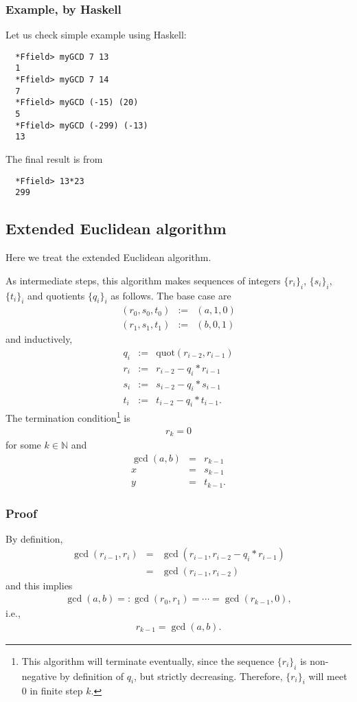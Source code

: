 \documentclass[11pt]{book}
\begin{document}
\subsubsection{Example, by Haskell}
Let us check simple example using Haskell:
\begin{verbatim}
  *Ffield> myGCD 7 13
  1
  *Ffield> myGCD 7 14
  7
  *Ffield> myGCD (-15) (20)
  5
  *Ffield> myGCD (-299) (-13)
  13
\end{verbatim}
The final result is from
\begin{verbatim}
  *Ffield> 13*23
  299
\end{verbatim}

\subsection{Extended Euclidean algorithm}
\label{exGCD}
Here we treat the extended Euclidean algorithm.

As intermediate steps, this algorithm makes sequences of integers $\{r_i\}_i$, $\{s_i\}_i$, $\{t_i\}_i$ and quotients $\{q_i\}_i$ as follows.
The base case are
\begin{eqnarray}
\left(r_0, s_0, t_0 \right) &:=& (a,1,0) \\
\left(r_1, s_1, t_1 \right) &:=& (b,0,1) 
\end{eqnarray}
and inductively,
\begin{eqnarray}
q_i &:=& \text{quot}(r_{i-2}, r_{i-1}) \\
r_i &:=& r_{i-2} - q_i * r_{i-1} \\
s_i &:=& s_{i-2} - q_i * s_{i-1} \\
t_i &:=& t_{i-2} - q_i * t_{i-1}.
\end{eqnarray}
The termination condition\footnote{
This algorithm will terminate eventually, since the sequence $\{r_i\}_i$ is non-negative by definition of $q_i$, but strictly decreasing.
Therefore, $\{r_i\}_i$ will meet $0$ in finite step $k$.
} is
\begin{eqnarray}
r_k = 0
\end{eqnarray}
for some $k \in \mathbb{N}$ and
\begin{eqnarray}
\gcd(a,b) &=& r_{k-1} \\
x &=& s_{k-1} \\
y &=& t_{k-1}.
\end{eqnarray}

\subsubsection{Proof}
By definition,
\begin{eqnarray}
\gcd(r_{i-1}, r_i) &=& \gcd(r_{i-1}, r_{i-2} - q_i * r_{i-1}) \\
&=& \gcd(r_{i-1}, r_{i-2})
\end{eqnarray}
and this implies 
\begin{eqnarray}
\gcd(a,b) =: \gcd(r_0, r_1) = \cdots = \gcd(r_{k-1}, 0),
\end{eqnarray}
i.e., 
\begin{eqnarray}
r_{k-1} = \gcd(a,b).
\end{eqnarray}
\end{document}
